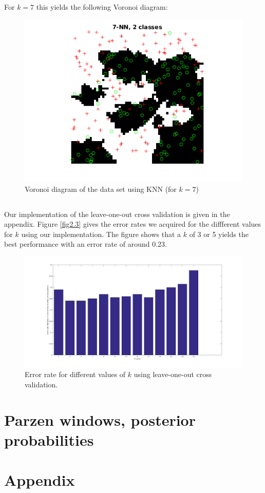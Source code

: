 \documentclass[10pt]{article}
\begin{document}
For $k=7$ this yields the following Voronoi diagram:
\begin{figure}[H]
 \centering
 \includegraphics[width=\textwidth]{assign2_2_7.png}
 \caption{Voronoi diagram of the data set using KNN (for $k=7$)}
 \label{fig2.1d}
\end{figure}

\subsection{}
Our implementation of the leave-one-out cross validation is given in the appendix. Figure \ref{fig2.3} gives the error rates we acquired for the diffferent values for $k$ using our implementation. The figure shows that a $k$ of 3 or 5 yields the best performance with an error rate of around 0.23.

\begin{figure}[H]
 \centering
 \includegraphics[width=\textwidth]{assign2_3.png}
 \caption{Error rate for different values of $k$ using leave-one-out cross validation.}
 \label{fig2.1d}
\end{figure}

\section{Parzen windows, posterior probabilities}

\section*{Appendix}




\end{document}
